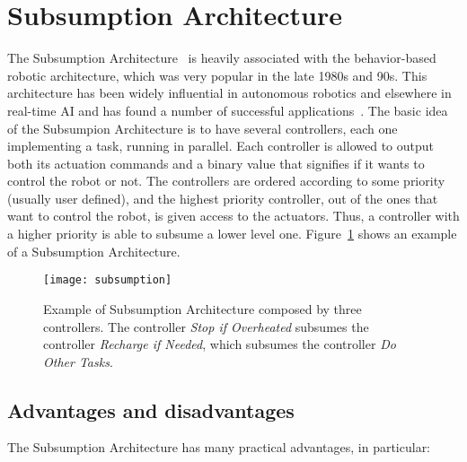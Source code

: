 \section{Subsumption Architecture}
\label{sec:SA}
The Subsumption Architecture~\cite{brooks1986robust} is heavily associated with the behavior-based robotic architecture, which was very popular in the late 1980s and 90s. 
This architecture has been widely influential in autonomous robotics and elsewhere in real-time AI and  has found a number of successful applications~\cite{brooks1990elephants}.
The basic idea of the Subsumpion Architecture is to have several controllers, each one implementing a task, running in parallel. Each controller is allowed to output both its actuation commands and a binary value that signifies if it wants to control the robot or not. The controllers are ordered according to some priority (usually user defined), and the highest priority controller, out of the ones that want to control the robot, is given access to the actuators. Thus, a controller with a higher priority is able to subsume a lower level one. Figure~\ref{Arch.fig.subsump} shows an example of a Subsumption Architecture.





\begin{figure}[h]
\centering
\texttt{[image: subsumption]} 
   \caption{Example of Subsumption Architecture composed by three controllers. The controller \emph{Stop if Overheated} subsumes the controller \emph{Recharge if Needed}, which subsumes the controller \emph{Do Other Tasks}.}
    \label{Arch.fig.subsump}
\end{figure}



\subsection{Advantages and disadvantages}

The Subsumption Architecture has many practical advantages, in particular:

